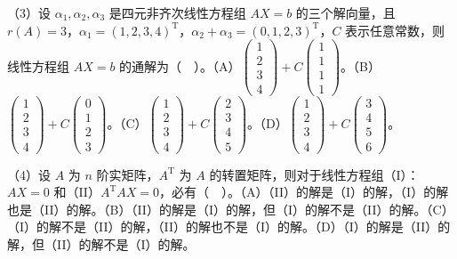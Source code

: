 \documentclass[UTF8,12pt]{ctexart}
\begin{document}
（3）设 \(\displaystyle \alpha_1,\allowbreak \alpha_2,\allowbreak \alpha_3\) 是四元非齐次线性方程组 \(\displaystyle AX=b\) 的三个解向量，且 \(\displaystyle r(A)=3\)，\(\displaystyle \alpha_1=(1,\allowbreak 2,\allowbreak 3,\allowbreak 4)^{\mathrm T}\)，\(\displaystyle \alpha_2+\alpha_3=(0,\allowbreak 1,\allowbreak 2,\allowbreak 3)^{\mathrm T}\)，\(\displaystyle C\) 表示任意常数，则线性方程组 \(\displaystyle AX=b\) 的通解为（　）。（A）\(\displaystyle \begin{pmatrix}1\\2\\3\\4\end{pmatrix}+C\begin{pmatrix}1\\1\\1\\1\end{pmatrix}\)。（B）\(\displaystyle \begin{pmatrix}1\\2\\3\\4\end{pmatrix}+C\begin{pmatrix}0\\1\\2\\3\end{pmatrix}\)。（C）\(\displaystyle \begin{pmatrix}1\\2\\3\\4\end{pmatrix}+C\begin{pmatrix}2\\3\\4\\5\end{pmatrix}\)。（D）\(\displaystyle \begin{pmatrix}1\\2\\3\\4\end{pmatrix}+C\begin{pmatrix}3\\4\\5\\6\end{pmatrix}\)。


（4）设 \(\displaystyle A\) 为 \(\displaystyle n\) 阶实矩阵，\(\displaystyle A^{\mathrm T}\) 为 \(\displaystyle A\) 的转置矩阵，则对于线性方程组（I）：\(\displaystyle AX=0\) 和（II）\(\displaystyle A^{\mathrm T}AX=0\)，必有（　）。（A）（II）的解是（I）的解，（I）的解也是（II）的解。（B）（II）的解是（I）的解，但（I）的解不是（II）的解。（C）（I）的解不是（II）的解，（II）的解也不是（I）的解。（D）（I）的解是（II）的解，但（II）的解不是（I）的解。
\end{document}
